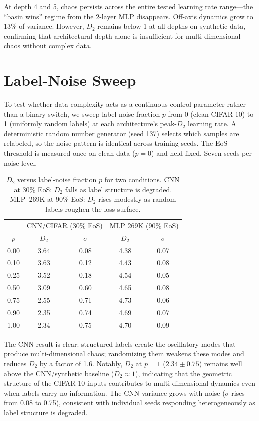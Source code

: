\documentclass[aps,prl,twocolumn,superscriptaddress]{revtex4-2}
\begin{document}
At depth 4 and 5, chaos persists across the entire tested learning rate range---the ``basin wins'' regime from the 2-layer MLP disappears. Off-axis dynamics grow to 13\% of variance. However, $D_2$ remains below 1 at all depths on synthetic data, confirming that architectural depth alone is insufficient for multi-dimensional chaos without complex data.

\section{Label-Noise Sweep}

To test whether data complexity acts as a continuous control parameter rather than a binary switch, we sweep label-noise fraction $p$ from 0 (clean CIFAR-10) to 1 (uniformly random labels) at each architecture's peak-$D_2$ learning rate. A deterministic random number generator (seed 137) selects which samples are relabeled, so the noise pattern is identical across training seeds. The EoS threshold is measured once on clean data ($p=0$) and held fixed. Seven seeds per noise level.

\begin{table}[h]
\caption{\label{tab:label_noise}%
$D_2$ versus label-noise fraction $p$ for two conditions. CNN at 30\% EoS: $D_2$ falls as label structure is degraded. MLP~269K at 90\% EoS: $D_2$ rises modestly as random labels roughen the loss surface.}
\begin{ruledtabular}
\begin{tabular}{ccccc}
 & \multicolumn{2}{c}{CNN/CIFAR (30\% EoS)} & \multicolumn{2}{c}{MLP 269K (90\% EoS)}\\
$p$ & $D_2$ & $\sigma$ & $D_2$ & $\sigma$\\
\hline
0.00 & 3.64 & 0.08 & 4.38 & 0.07\\
0.10 & 3.63 & 0.12 & 4.43 & 0.08\\
0.25 & 3.52 & 0.18 & 4.54 & 0.05\\
0.50 & 3.09 & 0.60 & 4.65 & 0.08\\
0.75 & 2.55 & 0.71 & 4.73 & 0.06\\
0.90 & 2.35 & 0.74 & 4.69 & 0.07\\
1.00 & 2.34 & 0.75 & 4.70 & 0.09\\
\end{tabular}
\end{ruledtabular}
\end{table}

The CNN result is clear: structured labels create the oscillatory modes that produce multi-dimensional chaos; randomizing them weakens these modes and reduces $D_2$ by a factor of 1.6. Notably, $D_2$ at $p = 1$ ($2.34 \pm 0.75$) remains well above the CNN/synthetic baseline ($D_2 \approx 1$), indicating that the geometric structure of the CIFAR-10 inputs contributes to multi-dimensional dynamics even when labels carry no information. The CNN variance grows with noise ($\sigma$ rises from 0.08 to 0.75), consistent with individual seeds responding heterogeneously as label structure is degraded.
\end{document}
